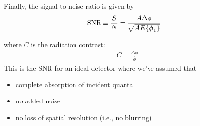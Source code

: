 \documentclass[mphy386-notes.tex]{subfiles}
\begin{document}
Finally, the signal-to-noise ratio is given by
 \begin{align}
   \text{SNR} &\equiv \frac{S}{N} = \frac{A\Delta\phi}{\sqrt{AE\{\boldsymbol{\phi}_1\}}}
 \end{align}   

where $C$ is the radiation contrast:
\begin{align}
  C = \frac{\Delta\phi}{\bar{\phi}}
\end{align}
This is the SNR for an ideal detector where we've assumed that
\begin{itemize}
\item complete absorption of incident quanta
\item no added noise
\item no loss of spatial resolution (i.e., no blurring)
\end{itemize}


\pagebreak
\end{document}
